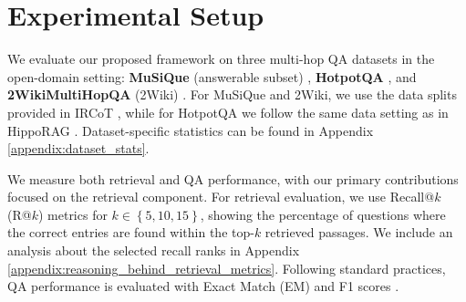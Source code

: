 \section{Experimental Setup}

We evaluate our proposed framework on three multi-hop QA datasets in the open-domain setting: \textbf{MuSiQue} (answerable subset) \cite{Trivedi2022}, \textbf{HotpotQA} \cite{Yang2018}, and \textbf{2WikiMultiHopQA} (2Wiki) \cite{Ho2020}.
For MuSiQue and 2Wiki, we use the data splits provided in IRCoT \cite{Trivedi2023}, while for HotpotQA we follow the same data setting as in HippoRAG \cite{Gutierrez2024}. Dataset-specific statistics can be found in Appendix \ref{appendix:dataset_stats}.

We measure both retrieval and QA performance, with our primary contributions focused on the retrieval component. For retrieval evaluation, we use Recall@$k$ (R@$k$) metrics for $k \in \left \{5, 10, 15\right \}$, showing the percentage of questions where the correct entries are found within the top-$k$ retrieved passages. We include an analysis about the selected recall ranks in Appendix \ref{appendix:reasoning_behind_retrieval_metrics}. Following standard practices, QA performance is evaluated with Exact Match (EM) and F1 scores \cite{Trivedi2023}.


